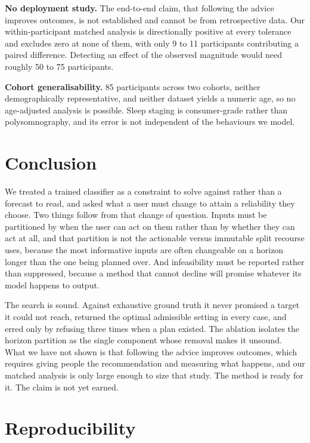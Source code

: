 \documentclass[conference,letterpaper]{IEEEtran}
\begin{document}
\textbf{No deployment study.} The end-to-end claim, that following the advice
improves outcomes, is not established and cannot be from retrospective data. Our
within-participant matched analysis is directionally positive at every tolerance
and excludes zero at none of them, with only 9 to 11 participants contributing a
paired difference. Detecting an effect of the observed magnitude would need
roughly 50 to 75 participants.

\textbf{Cohort generalisability.} 85 participants across two cohorts, neither
demographically representative, and neither dataset yields a numeric age, so no
age-adjusted analysis is possible. Sleep staging is consumer-grade rather than
polysomnography, and its error is not independent of the behaviours we model.

\section{Conclusion}
\label{sec:conclusion}

We treated a trained classifier as a constraint to solve against rather than a
forecast to read, and asked what a user must change to attain a reliability they
choose. Two things follow from that change of question. Inputs must be
partitioned by when the user can act on them rather than by whether they can act
at all, and that partition is not the actionable versus immutable split recourse
uses, because the most informative inputs are often changeable on a horizon
longer than the one being planned over. And infeasibility must be reported
rather than suppressed, because a method that cannot decline will promise
whatever its model happens to output.

The search is sound. Against exhaustive ground truth it never promised a target
it could not reach, returned the optimal admissible setting in every case, and
erred only by refusing three times when a plan existed. The ablation isolates
the horizon partition as the single component whose removal makes it unsound.
What we have not shown is that following the advice improves outcomes, which
requires giving people the recommendation and measuring what happens, and our
matched analysis is only large enough to size that study. The method is ready
for it. The claim is not yet earned.

\section*{Reproducibility}
\end{document}
